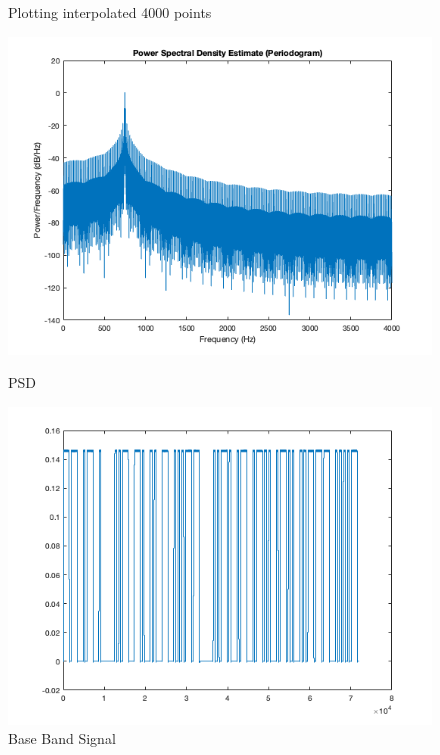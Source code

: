 \begin{figure}[H]
\begin{minipage}{.5\textwidth}
        \caption{Plotting interpolated 4000 points}
        \label{fig:figures/ex3_N.png}
    \end{minipage}
\end{figure}

\begin{figure}[H]
    \centering
    \begin{minipage}{.5\textwidth}
        \centering
        \includegraphics[width=\linewidth]{figures/ex3_psd.png}
        \caption{PSD}
        \label{fig:figures/ex3_psd.png}
    \end{minipage}%
    \begin{minipage}{.5\textwidth}
        \centering
        \includegraphics[width=\linewidth]{figures/ex3_bbs.png}
        \caption{Base Band Signal}
        \label{fig:figures/ex3_bbs.png}
    \end{minipage}
\end{figure}

